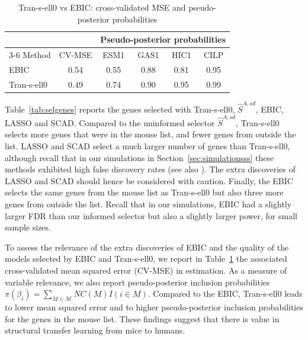\documentclass[
  12pt]{article}
\newcommand{\M}{\mathcal{M}}
\begin{document}
\begin{table}[ht]
\caption{Tran-s-ell0  vs EBIC: cross-validated MSE and pseudo-posterior probabilities}
\label{tab:cvmse.pseudoprob}
\centering
\begin{tabular}{lccccc}
\hline
 & & \multicolumn{4}{c}{Pseudo-posterior probabilities}  \\[3pt] \cline{3-6} 
 Method & CV-MSE & ESM1 & GAS1 & HIC1 & CILP\\ 
\hline
EBIC & 0.54& 0.55 & 0.88 & 0.81 & 0.95\\
\hline
Tran-s-ell0 & 0.49 & 0.74 & 0.90 & 0.95 & 0.99\\
\hline
\end{tabular}
\end{table}


Table~\ref{tab:selgenes} reports the genes selected with Tran-s-ell0, $\hat S^{A,sd}$, EBIC, LASSO and SCAD. Compared to the uninformed selector $\hat{S}^{A,sd}$, Tran-s-ell0
selects more genes that were in the mouse list, and fewer genes from outside the list. LASSO and SCAD select a much larger number of genes than Tran-s-ell0, although recall that in our simulations in Section~\ref{sec:simulationsss} these methods exhibited high  false discovery rates (see also \cite{slope}). The extra discoveries of LASSO and SCAD should hence be considered with caution. Finally, the EBIC selects the same genes from the mouse list as Tran-s-ell0 but also three more genes from outside the list. Recall that in our simulations, EBIC had a slightly larger FDR than our informed selector but also a slightly larger power, for small sample sizes. 

To assess the relevance of the extra discoveries of EBIC and the quality of the models selected by EBIC and Tran-s-ell0, we report in Table~\ref{tab:cvmse.pseudoprob} the associated cross-validated mean squared error (CV-MSE) in estimation.
As a measure of variable relevance, we also report pseudo-posterior inclusion probabilities $\pi(\beta_i)=\sum_{M\in\M} NC(M)I(i\in M)$. 
Compared to the EBIC, Tran-s-ell0 leads to lower mean squared error and to higher pseudo-posterior inclusion probabilities for the genes in the mouse list. These findings suggest that there is value in structural transfer learning from mice to humans.
\end{document}
